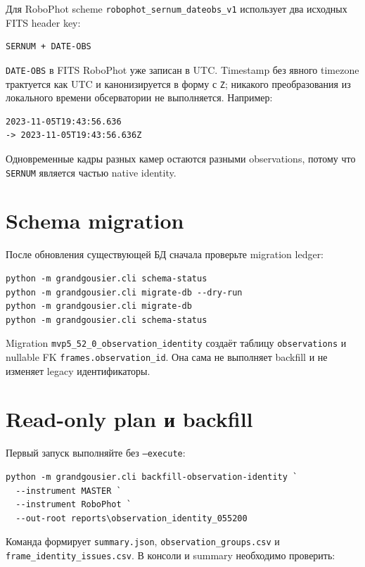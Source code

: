Для RoboPhot scheme \texttt{robophot\_sernum\_dateobs\_v1} использует два исходных FITS header key:

\begin{verbatim}
SERNUM + DATE-OBS
\end{verbatim}

\texttt{DATE-OBS} в FITS RoboPhot уже записан в UTC. Timestamp без явного timezone трактуется как UTC и канонизируется в форму с \texttt{Z}; никакого преобразования из локального времени обсерватории не выполняется. Например:

\begin{verbatim}
2023-11-05T19:43:56.636
-> 2023-11-05T19:43:56.636Z
\end{verbatim}

Одновременные кадры разных камер остаются разными observations, потому что \texttt{SERNUM} является частью native identity.

\section{Schema migration}

После обновления существующей БД сначала проверьте migration ledger:

\begin{lstlisting}
python -m grandgousier.cli schema-status
python -m grandgousier.cli migrate-db --dry-run
python -m grandgousier.cli migrate-db
python -m grandgousier.cli schema-status
\end{lstlisting}

Migration \texttt{mvp5\_52\_0\_observation\_identity} создаёт таблицу \texttt{observations} и nullable FK \texttt{frames.observation\_id}. Она сама не выполняет backfill и не изменяет legacy идентификаторы.

\section{Read-only plan и backfill}

Первый запуск выполняйте без \texttt{--execute}:

\begin{lstlisting}
python -m grandgousier.cli backfill-observation-identity `
  --instrument MASTER `
  --instrument RoboPhot `
  --out-root reports\observation_identity_055200
\end{lstlisting}

Команда формирует \texttt{summary.json}, \texttt{observation\_groups.csv} и \texttt{frame\_identity\_issues.csv}. В консоли и summary необходимо проверить:

